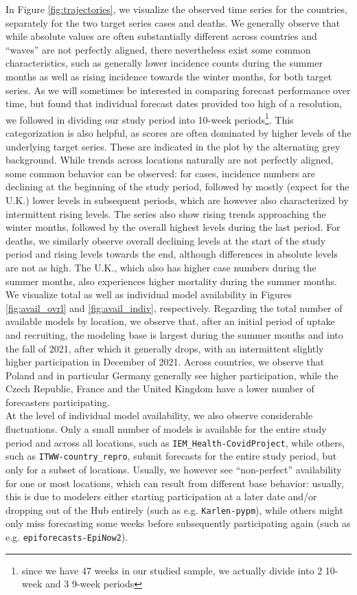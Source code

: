 In Figure \ref{fig:trajectories}, we visualize the observed time series for the countries, separately for the two target series cases and deaths. We generally observe that while absolute values are often substantially different across countries and ``waves'' are not perfectly aligned, there nevertheless exist some common characteristics, such as generally lower incidence counts during the summer months as well as rising incidence towards the winter months, for both target series. As we will sometimes be interested in comparing forecast performance over time, but found that individual forecast dates provided too high of a resolution, we followed \cite{taylor_combining_2021} in dividing our study period into 10-week periods\footnote{since we have 47 weeks in our studied sample, we actually divide into 2 10-week and 3 9-week periods}. This categorization is also helpful, as scores are often dominated by higher levels of the underlying target series. These are indicated in the plot by the alternating grey background. While trends across locations naturally are not perfectly aligned, some common behavior can be observed: for cases, incidence numbers are declining at the beginning of the study period, followed by mostly (expect for the U.K.) lower levels in subsequent periods, which are however also characterized by intermittent rising levels. The series also show rising trends approaching the winter months, followed by the overall highest levels during the last period. For deaths, we similarly observe overall declining levels at the start of the study period and rising levels towards the end, although differences in absolute levels are not as high. The U.K., which also has higher case numbers during the summer months, also experiences higher mortality during the summer months.\\
We visualize total as well as individual model availability in Figures \ref{fig:avail_ovrl} and \ref{fig:avail_indiv}, respectively. Regarding the total number of available models by location, we observe that, after an initial period of uptake and recruiting, the modeling base is largest during the summer months and into the fall of 2021, after which it generally drops, with an intermittent slightly higher participation in December of 2021. Across countries, we observe that Poland and in particular Germany generally see higher participation, while the Czech Republic, France and the United Kingdom have a lower number of forecasters participating.\\
At the level of individual model availability, we also observe considerable fluctuations. Only a small number of models is available for the entire study period and across all locations, such as \texttt{IEM\_Health-CovidProject}, while others, such as \texttt{ITWW-country\_repro}, submit forecasts for the entire study period, but only for a subset of locations. Usually, we however see ``non-perfect'' availability for one or most locations, which can result from different base behavior: usually, this is due to modelers either starting participation at a later date and/or dropping out of the Hub entirely (such as e.g. \texttt{Karlen-pypm}), while others might only miss forecasting some weeks before subsequently participating again (such as e.g. \texttt{epiforecasts-EpiNow2}).
